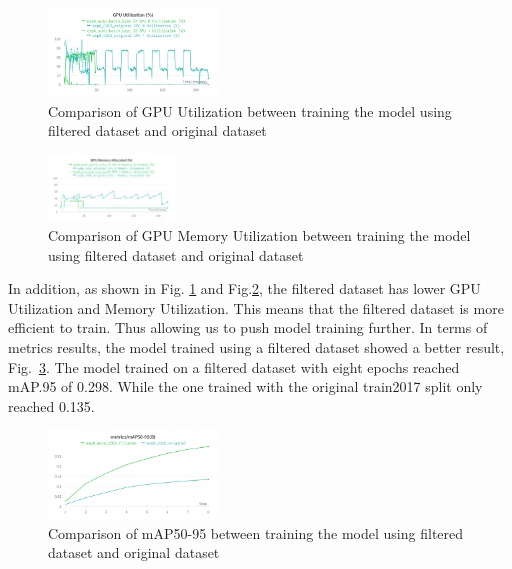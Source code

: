\documentclass[conference]{IEEEtran}
\begin{document}
\begin{figure}[h!]
\centering
\includegraphics[width=0.4\textwidth,keepaspectratio]{gpu_utilization_comparison_original_and_filtered.png}
\caption{Comparison of GPU Utilization between training the model using filtered dataset and original dataset}
\label{fig:original_filtered_gpu_utilization}
\end{figure}

\begin{figure}[h!]
\centering
\includegraphics[width=0.3\textwidth,keepaspectratio]{memory_utilization_comparison_original_and_filtered.png}
\caption{Comparison of GPU Memory Utilization between training the model using filtered dataset and original dataset}
\label{fig:original_filtered_memory_utilization}
\end{figure}
In addition, as shown in Fig. \ref{fig:original_filtered_gpu_utilization} and Fig.\ref{fig:original_filtered_memory_utilization}, the filtered dataset has lower GPU Utilization and Memory Utilization. This means that the filtered dataset is more efficient to train.
Thus allowing us to push model training further.
In terms of metrics results, the model trained using a filtered dataset showed a better result, Fig.~\ref{fig:training_comparison}. The model trained on a filtered dataset with eight epochs reached mAP.95 of 0.298. While the one trained with the original train2017 split only reached 0.135.
\begin{figure}
\centering
\includegraphics[width=0.4\textwidth,keepaspectratio]{comparison_mAP_filtered.png}
\caption{Comparison of mAP50-95 between training the model using filtered dataset and original dataset}
\label{fig:training_comparison}
\end{figure}
\end{document}
